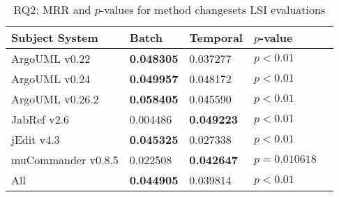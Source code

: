 
\begin{table}[t]
\renewcommand{\arraystretch}{1.3}
\footnotesize
\centering
\caption{RQ2: MRR and $p$-values for method changesets LSI evaluations}
\begin{tabular}{l|ll|ll}
   \toprule
    Subject System & Batch           & Temporal        & $p$-value      \\
    \midrule

ArgoUML v0.22      & {\bf 0.048305 } & 0.037277        & $p < 0.01$     \\
ArgoUML v0.24      & {\bf 0.049957 } & 0.048172        & $p < 0.01$     \\
ArgoUML v0.26.2    & {\bf 0.058405 } & 0.045590        & $p < 0.01$     \\
JabRef v2.6        & 0.004486        & {\bf 0.049223 } & $p < 0.01$     \\
jEdit v4.3         & {\bf 0.045325 } & 0.027338        & $p < 0.01$     \\
muCommander v0.8.5 & 0.022508        & {\bf 0.042647 } & $p = 0.010618$ \\
\midrule
All                & {\bf 0.044905 } & 0.039814        & $p < 0.01$     \\

    \bottomrule
\end{tabular}
\label{table:rq2:method:lsi}
\end{table}

